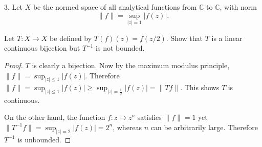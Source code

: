 \begin{problem}
	
3. Let $X$ be the normed space of all analytical functions from $\mathbb{C}$ to $\mathbb{C}$, with norm
\[
\|f\|=\sup _{|z|=1}|f(z)| .
\]

Let $T: X \rightarrow X$ be defined by $T(f)(z)=f(z / 2)$. Show that $T$ is a linear continuous bijection but $T^{-1}$ is not bounded.
\end{problem}
\begin{proof}
	$T$ is clearly a bijection. Now
	by the maximum modulus principle, $\|f\| = \sup _{|z|\le 1}|f(z)|$. Therefore $\|f\| = \sup _{|z|\le 1}|f(z)| \ge \sup _{|z| = \frac{1}{2}}|f(z)| = \| T f\|$. This shows $T$ is continuous. 

	On the other hand, the function $f: z \mapsto z^n$ satisfies $\|f\| = 1$ yet $\|T^{-1}f\| = \sup _{|z| = 2} |f(z)| = 2^n$, whereas $n$ can be arbitrarily large. Therefore $T^{-1}$ is unbounded.

	
\end{proof}

